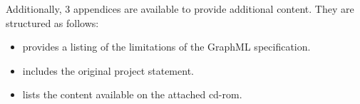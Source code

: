 Additionally, 3 appendices are available to provide additional content. They are structured as follows:

\begin{itemize}
  \item {} provides a listing of the limitations of the GraphML specification.
  \item {} includes the original project statement.
  \item {} lists the content available on the attached \gls{cd-rom}.
\end{itemize}
